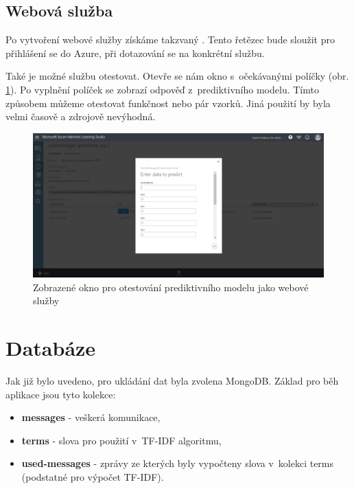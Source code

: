 \documentclass[thesis=M,czech]{FITthesis}[2012/10/20]
\begin{document}
		\subsection{Webová služba}
		  Po vytvoření webové služby získáme takzvaný . Tento řetězec bude sloužit pro přihlášení se do Azure, při dotazování se na konkrétní službu.
		  
		  Také je možné službu otestovat. Otevře se nám okno s~očekávanými políčky (obr. \ref{fig:azure_test_web_service}). Po vyplnění políček se zobrazí odpověď z~prediktivního modelu. Tímto způsobem můžeme otestovat funkčnost nebo pár vzorků. Jiná použití by byla velmi časově a zdrojově nevýhodná.
		  
		  \begin{figure}[htb]\centering
		  	\includegraphics[width=\textwidth]{./img/testPredictive}
		  	\caption{Zobrazené okno pro otestování prediktivního modelu jako webové služby}
		  	\label{fig:azure_test_web_service}
		  \end{figure}
	\section{Databáze}
	\label{sec:database}	
	Jak již bylo uvedeno, pro ukládání dat byla zvolena MongoDB. Základ pro běh aplikace jsou tyto kolekce:
		
	\begin{itemize} 
		\item \textbf{messages} - veškerá komunikace,
		\item \textbf{terms} - slova pro použití v~TF-IDF algoritmu,
		\item \textbf{used-messages} - zprávy ze kterých byly vypočteny slova v~kolekci terms (podstatné pro výpočet TF-IDF).	
	\end{itemize} 
	
\end{document}
